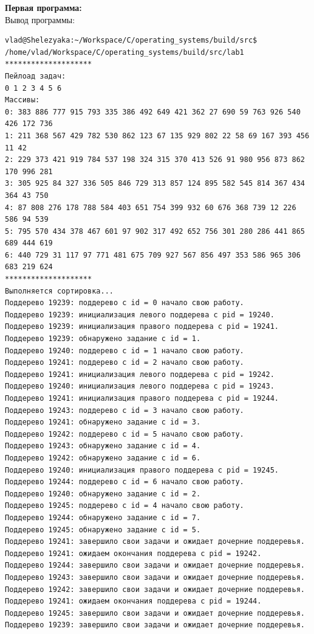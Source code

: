 \documentclass[a4paper,14pt]{extarticle}
\begin{document}
\textbf{Первая программа:}\\
Вывод программы:\\
\begin{verbatim}
vlad@Shelezyaka:~/Workspace/C/operating_systems/build/src$ /home/vlad/Workspace/C/operating_systems/build/src/lab1
********************
Пейлоад задач:
0 1 2 3 4 5 6 
Массивы:
0: 383 886 777 915 793 335 386 492 649 421 362 27 690 59 763 926 540 426 172 736 
1: 211 368 567 429 782 530 862 123 67 135 929 802 22 58 69 167 393 456 11 42 
2: 229 373 421 919 784 537 198 324 315 370 413 526 91 980 956 873 862 170 996 281 
3: 305 925 84 327 336 505 846 729 313 857 124 895 582 545 814 367 434 364 43 750 
4: 87 808 276 178 788 584 403 651 754 399 932 60 676 368 739 12 226 586 94 539 
5: 795 570 434 378 467 601 97 902 317 492 652 756 301 280 286 441 865 689 444 619 
6: 440 729 31 117 97 771 481 675 709 927 567 856 497 353 586 965 306 683 219 624 
********************
Выполняется сортировка...
Поддерево 19239: поддерево с id = 0 начало свою работу.
Поддерево 19239: инициализация левого поддерева с pid = 19240.
Поддерево 19239: инициализация правого поддерева с pid = 19241.
Поддерево 19239: обнаружено задание с id = 1.
Поддерево 19240: поддерево с id = 1 начало свою работу.
Поддерево 19241: поддерево с id = 2 начало свою работу.
Поддерево 19241: инициализация левого поддерева с pid = 19242.
Поддерево 19240: инициализация левого поддерева с pid = 19243.
Поддерево 19241: инициализация правого поддерева с pid = 19244.
Поддерево 19243: поддерево с id = 3 начало свою работу.
Поддерево 19241: обнаружено задание с id = 3.
Поддерево 19242: поддерево с id = 5 начало свою работу.
Поддерево 19243: обнаружено задание с id = 4.
Поддерево 19242: обнаружено задание с id = 6.
Поддерево 19240: инициализация правого поддерева с pid = 19245.
Поддерево 19244: поддерево с id = 6 начало свою работу.
Поддерево 19240: обнаружено задание с id = 2.
Поддерево 19245: поддерево с id = 4 начало свою работу.
Поддерево 19244: обнаружено задание с id = 7.
Поддерево 19245: обнаружено задание с id = 5.
Поддерево 19241: завершило свои задачи и ожидает дочерние поддеревья.
Поддерево 19241: ожидаем окончания поддерева с pid = 19242.
Поддерево 19244: завершило свои задачи и ожидает дочерние поддеревья.
Поддерево 19243: завершило свои задачи и ожидает дочерние поддеревья.
Поддерево 19242: завершило свои задачи и ожидает дочерние поддеревья.
Поддерево 19241: ожидаем окончания поддерева с pid = 19244.
Поддерево 19245: завершило свои задачи и ожидает дочерние поддеревья.
Поддерево 19239: завершило свои задачи и ожидает дочерние поддеревья.

\end{verbatim}
\end{document}
